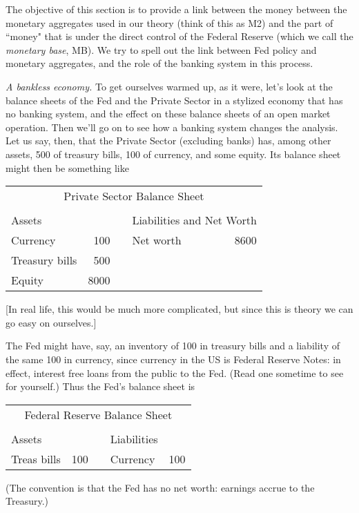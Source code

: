 \documentclass[letterpaper,12pt]{article}
\begin{document}
     The objective of this section is to provide a link between the money
between the monetary aggregates used in our theory (think of this as M2) and the part of ``money"
that is under the direct control of the Federal Reserve (which we call the {\em monetary base},
MB).  We try to spell out the link between Fed policy and monetary aggregates, and the role of the
banking system in this process.

     {\em A bankless economy.}
To get ourselves warmed up, as it were, let's look at the balance sheets of the Fed and the
Private Sector in a stylized economy that has no banking system, and the effect on these balance
sheets of an open market operation.  Then we'll go on to see how a banking system changes the
analysis.  Let us say, then, that the Private Sector (excluding banks) has, among other assets,
500 of treasury bills, 100 of currency, and some equity.  Its balance sheet might then be
something like
%
\begin{center}
\begin{tabular}{lrclr}
\multicolumn{5}{c}{Private Sector Balance Sheet}                             \\
                                                                &       \\
            Assets                &&&
                        \multicolumn{2}{l}{Liabilities and Net Worth}   \\
            Currency        &   100   &&   Net worth  &   8600          \\
            Treasury bills  &   500   &&                                \\
            Equity          &  8000   &&                                \\
\end{tabular}
\end{center}
%
[In real life, this would be much more complicated, but since this is theory we can go easy on
ourselves.]

     The Fed might have, say, an inventory of 100 in treasury bills and a
liability of the same 100 in currency, since currency in the US is Federal Reserve Notes:  in
effect, interest free loans from the public to the Fed. (Read one sometime to see for yourself.)
Thus the Fed's balance sheet is
%
\begin{center}
\begin{tabular}{lrclr}
\multicolumn{5}{c}{Federal Reserve Balance Sheet}               \\
                                                        &       \\
                    Assets      &&&          Liabilities        \\
                    Treas bills & 100    &&  Currency   &100    \\
\end{tabular}
\end{center}
%
(The convention is that the Fed has no net worth:  earnings accrue to the Treasury.)
\end{document}
